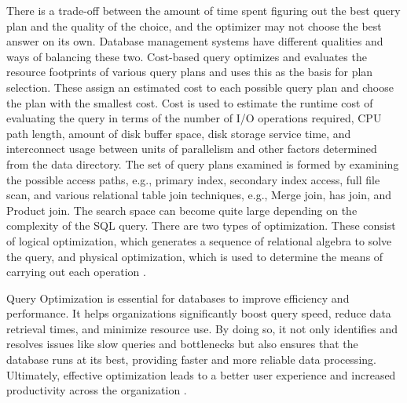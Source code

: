 There is a trade-off between the amount of time spent figuring out the best query plan and the quality of the choice, and the optimizer may not choose the best answer on its own. Database management systems have different qualities and ways of balancing these two. Cost-based query optimizes and evaluates the resource footprints of various query plans and uses this as the basis for plan selection. These assign an estimated cost to each possible query plan and choose the plan with the smallest cost. Cost is used to estimate the runtime cost of evaluating the query in terms of the number of I/O operations required, CPU path length, amount of disk buffer space, disk storage service time, and interconnect usage between units of parallelism and other factors determined from the data directory. The set of query plans examined is formed by examining the possible access paths, e.g., primary index, secondary index access, full file scan, and various relational table join techniques, e.g., Merge join, has join, and Product join. The search space can become quite large depending on the complexity of the SQL query. There are two types of optimization. These consist of logical optimization, which generates a sequence of relational algebra to solve the query, and physical optimization, which is used to determine the means of carrying out each operation \cite{dremio-2024}.\vspace{.4cm}

Query Optimization is essential for databases to improve efficiency and performance. It helps organizations significantly boost query speed, reduce data retrieval times, and minimize resource use. By doing so, it not only identifies and resolves issues like slow queries and bottlenecks but also ensures that the database runs at its best, providing faster and more reliable data processing. Ultimately, effective optimization leads to a better user experience and increased productivity across the organization \cite{team-2023, r-2024}.


